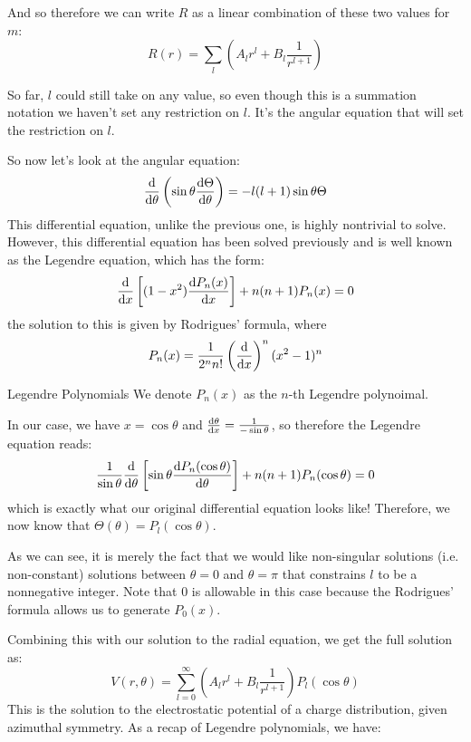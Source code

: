 And so therefore we can write $R$ as a linear combination of these two values for $m$: 
\[ R(r) = \sum_l \left( A_l r^l + B_l \frac{1}{r^{l+1}} \right) \]
\begin{insight*}{}
		So far, $l$ could still take on any value, so even though this is a summation notation we haven't set any
		restriction on $l$. It's the angular equation that will set the restriction on $l$.
\end{insight*}
So now let's look at the angular equation:
\[ \dv{\theta} \left( \sin \theta \dv{\Theta}{\theta} \right) = -l(l+1) \sin \theta \Theta \]
This differential equation, unlike the previous one, is highly nontrivial to solve. However, this differential 
equation has been solved previously and is well known as the Legendre equation, which has the form: 
\[ \dv{x}\left[(1-x^2) \dv{P_n(x)}{x}\right] + n(n+1)P_n(x) = 0\]
the solution to this is given by Rodrigues' formula, where 
\[ P_n(x) = \frac{1}{2^n n!}\left( \dv{x} \right)^n (x^2-1)^n\]
\begin{notation*}{Legendre Polynomials}
		We denote $P_n(x)$ as the $n$-th Legendre polynoimal.
\end{notation*}
In our case, we have $x = \cos \theta$ and $\dv{\theta}{x} = \frac{1}{-\sin \theta}$, so therefore the Legendre
equation reads:
\[ \frac{1}{\sin \theta}\dv{\theta} \left[ \sin \theta \dv{P_n(\cos \theta)}{\theta}\right] + n(n+1)P_n(\cos
\theta) = 0\] 
which is exactly what our original differential equation looks like! Therefore, we now know that $\Theta(\theta) =
P_l(\cos \theta)$. 
\begin{insight*}{}
		As we can see, it is merely the fact that we would like non-singular solutions (i.e. non-constant) 
		solutions between $\theta =0$ and $\theta = \pi$ that constrains $l$ to be a nonnegative integer. Note 
		that $0$ is allowable in this case because the Rodrigues' formula allows us to generate $P_0(x)$.
\end{insight*}
Combining this with our solution to the radial equation, we get the full solution as:
\[ V(r, \theta) = \sum_{l = 0}^\infty \left(A_lr^l + B_l \frac{1}{r^{l+1}}\right) P_l(\cos \theta)\]
This is the solution to the electrostatic potential of a charge distribution, given azimuthal symmetry. As
a recap of Legendre polynomials, we have:
